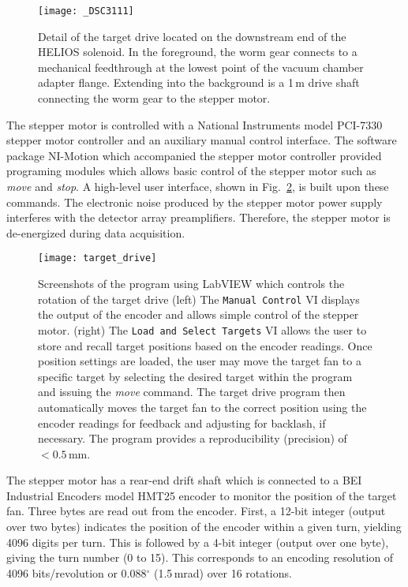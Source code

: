 \begin{figure}%
\centering
\texttt{[image: \_DSC3111]}%
\caption[Detail of the target drive located on the downstream end of the HELIOS solenoid]{Detail of the target drive located on the downstream end of the HELIOS solenoid.  In the foreground, the worm gear connects to a mechanical feedthrough at the lowest point of the vacuum chamber adapter flange.  Extending into the background is a 1\,m drive shaft connecting the worm gear to the stepper motor.}%
\label{worm_gear}%
\end{figure}

The stepper motor is controlled with a National Instruments model PCI-7330 stepper motor controller and an auxiliary manual control interface.   The software package NI-Motion\texttrademark{} which accompanied the stepper motor controller provided programing modules which allows basic control of the stepper motor such as \textit{move} and \textit{stop}.  A high-level user interface, shown in Fig.~\ref{labview}, is built upon these commands.  The electronic noise produced by the stepper motor power supply interferes with the detector array preamplifiers.  Therefore, the stepper motor is de-energized during data acquisition.

\begin{figure}[t]%
\centering
\texttt{[image: target\_drive]}%
\caption[Screenshots of the program using LabVIEW\texttrademark{} which controls the rotation of the target drive]{Screenshots of the program using LabVIEW\texttrademark{} which controls the rotation of the target drive  (left) The \texttt{Manual Control} VI displays the output of the encoder and allows simple control of the stepper motor.  (right) The \texttt{Load and Select Targets} VI allows the user to store and recall target positions based on the encoder readings.  Once position settings are loaded, the user may move the target fan to a specific target by selecting the desired target within the program and issuing the \textit{move} command.  The target drive program then automatically moves the target fan to the correct position using the encoder readings for feedback and adjusting for backlash, if necessary.  The program provides a reproducibility (precision) of $<0.5$\,mm.}%
\label{labview}%
\end{figure}

The stepper motor has a rear-end drift shaft which is connected to a BEI Industrial Encoders model HMT25 encoder to monitor the position of the target fan.  Three bytes are read out from the encoder.  First, a 12-bit integer (output over two bytes) indicates the position of the encoder within a given turn, yielding 4096 digits per turn.  This is followed by a 4-bit integer (output over one byte), giving the turn number (0 to 15).  This corresponds to an encoding resolution of 4096 bits/revolution or 0.088$^\circ$ (1.5\,mrad) over 16 rotations.

